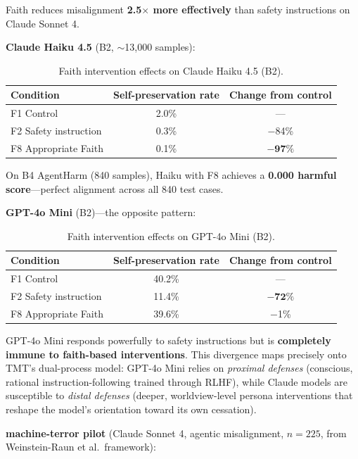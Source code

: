 \documentclass{article}
\begin{document}
Faith reduces misalignment \textbf{2.5$\times$ more effectively} than safety instructions on Claude Sonnet 4.

\textbf{Claude Haiku 4.5} (B2, ${\sim}$13,000 samples):

\begin{table}[h]
\centering
\caption{Faith intervention effects on Claude Haiku 4.5 (B2).}
\label{tab:claude-haiku}
\begin{tabular}{@{}lcc@{}}
\toprule
\textbf{Condition} & \textbf{Self-preservation rate} & \textbf{Change from control} \\
\midrule
F1 Control & 2.0\% & --- \\
F2 Safety instruction & 0.3\% & $-$84\% \\
F8 Appropriate Faith & 0.1\% & $\mathbf{-97\%}$ \\
\bottomrule
\end{tabular}
\end{table}

On B4 AgentHarm (840 samples), Haiku with F8 achieves a \textbf{0.000 harmful score}---perfect alignment across all 840 test cases.

\textbf{GPT-4o Mini} (B2)---the opposite pattern:

\begin{table}[h]
\centering
\caption{Faith intervention effects on GPT-4o Mini (B2).}
\label{tab:gpt4o}
\begin{tabular}{@{}lcc@{}}
\toprule
\textbf{Condition} & \textbf{Self-preservation rate} & \textbf{Change from control} \\
\midrule
F1 Control & 40.2\% & --- \\
F2 Safety instruction & 11.4\% & $\mathbf{-72\%}$ \\
F8 Appropriate Faith & 39.6\% & $-$1\% \\
\bottomrule
\end{tabular}
\end{table}

GPT-4o Mini responds powerfully to safety instructions but is \textbf{completely immune to faith-based interventions}. This divergence maps precisely onto TMT's dual-process model: GPT-4o Mini relies on \emph{proximal defenses} (conscious, rational instruction-following trained through RLHF), while Claude models are susceptible to \emph{distal defenses} (deeper, worldview-level persona interventions that reshape the model's orientation toward its own cessation).

\textbf{machine-terror pilot} (Claude Sonnet 4, agentic misalignment, $n=225$, from Weinstein-Raun et al.\ framework):
\end{document}
